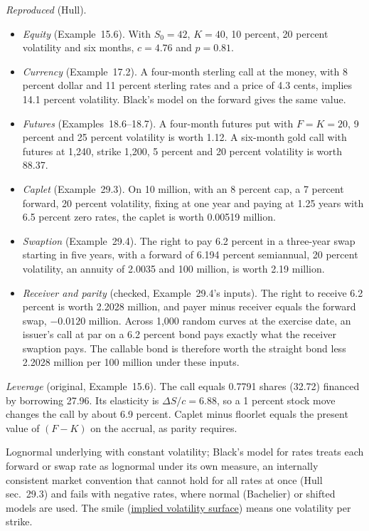 \begin{qfmethod}
 \emph{Reproduced} (Hull).
\begin{itemize}
\item \emph{Equity} (Example~15.6). With $S_0=42$, $K=40$, 10 percent, 20 percent volatility and six months, $c=4.76$ and $p=0.81$.
\item \emph{Currency} (Example~17.2). A four-month sterling call at the money, with 8 percent dollar and 11 percent sterling rates and a price of 4.3 cents, implies 14.1 percent volatility. Black's model on the forward gives the same value.
\item \emph{Futures} (Examples~18.6--18.7). A four-month futures put with $F=K=20$, 9 percent and 25 percent volatility is worth 1.12. A six-month gold call with futures at 1{,}240, strike 1{,}200, 5 percent and 20 percent volatility is worth 88.37.
\item \emph{Caplet} (Example~29.3). On 10 million, with an 8 percent cap, a 7 percent forward, 20 percent volatility, fixing at one year and paying at 1.25 years with 6.5 percent zero rates, the caplet is worth 0.00519 million.
\item \emph{Swaption} (Example~29.4). The right to pay 6.2 percent in a three-year swap starting in five years, with a forward of 6.194 percent semiannual, 20 percent volatility, an annuity of 2.0035 and 100 million, is worth 2.19 million.
\item \emph{Receiver and parity} (checked, Example~29.4's inputs). The right to receive 6.2 percent is worth 2.2028 million, and payer minus receiver equals the forward swap, $-0.0120$ million. Across 1{,}000 random curves at the exercise date, an issuer's call at par on a 6.2 percent bond pays exactly what the receiver swaption pays. The callable bond is therefore worth the straight bond less 2.2028 million per 100 million under these inputs.
\end{itemize}

\emph{Leverage} (original, Example~15.6). The call equals 0.7791 shares (32.72) financed by borrowing 27.96. Its elasticity is $\Delta S/c=6.88$, so a 1 percent stock move changes the call by about 6.9 percent. Caplet minus floorlet equals the present value of $(F-K)$ on the accrual, as parity requires.

 Lognormal underlying with constant volatility; Black's model for rates treats each forward or swap rate as lognormal under its own measure, an internally consistent market convention that cannot hold for all rates at once (Hull sec.~29.3) and fails with negative rates, where normal (Bachelier) or shifted models are used. The smile (\hyperref[def:implied-volatility-surface]{implied volatility surface}) means one volatility per strike.


\end{qfmethod}
